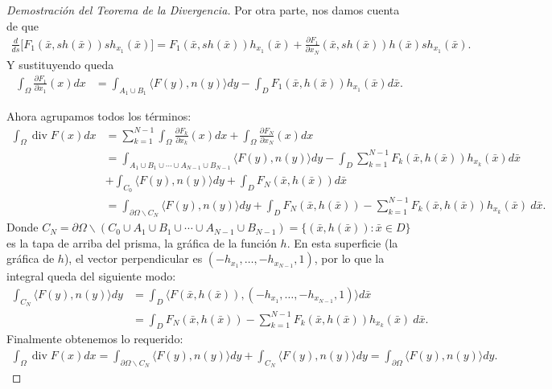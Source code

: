 \documentclass[12pt,spanish]{article}
\theoremstyle{definition}
\theoremstyle{remark}
\begin{document}
\begin{proof}[Demostración del Teorema de la Divergencia]
	Por otra parte, nos damos cuenta de que
	\begin{align*}
	\frac{d}{ds}\big[F_1(\bar{x},sh(\bar{x}))sh_{x_1}(\bar{x})\big]=F_1(\bar{x},sh(\bar{x}))h_{x_1}(\bar{x})+\frac{\partial F_1}{\partial x_N}(\bar{x},sh(\bar{x}))h(\bar{x})sh_{x_1}(\bar{x}).
	\end{align*}
	Y sustituyendo queda
	\begin{align*}
	\int_\Omega\frac{\partial F_1}{\partial x_1}(x)dx
	&=\int_{A_1\cup B_1}\langle F(y),n(y)\rangle dy-\int_D F_1(\bar{x},h(\bar{x}))h_{x_1}(\bar{x})d\bar{x}.
	\end{align*}
	
	Ahora agrupamos todos los términos:
	\begin{align*}
	\int_\Omega \operatorname{div}F(x)dx&=\sum_{k=1}^{N-1}\int_\Omega\frac{\partial F_k}{\partial x_k}(x)dx+\int_\Omega\frac{\partial F_N}{\partial x_N}(x)dx\\
	&=\int_{A_1\cup B_1\cup\cdots\cup A_{N-1}\cup B_{N-1}}\langle F(y),n(y)\rangle dy-\int_D\sum_{k=1}^{N-1}F_k(\bar{x},h(\bar{x}))h_{x_k}(\bar{x})d\bar{x}\\
	&+\int_{C_0}\langle F(y),n(y)\rangle dy + \int_D F_N(\bar{x},h(\bar{x}))d\bar{x} \\
	&=\int_{\partial\Omega\backslash C_N}\langle F(y),n(y)\rangle dy+\int_D F_N(\bar{x},h(\bar{x}))-\sum_{k=1}^{N-1}F_k(\bar{x},h(\bar{x}))h_{x_k}(\bar{x}) \ d\bar{x}.
	\end{align*}
	Donde $C_N=\partial\Omega \backslash\left(C_0\cup A_1\cup B_1\cup\cdots\cup A_{N-1}\cup B_{N-1}\right)=\{(\bar{x},h(\bar{x})):\bar{x}\in D\}$ es la tapa de arriba del prisma, la gráfica de la función $h$. En esta superficie (la gráfica de $h$), el vector perpendicular es $(-h_{x_1},\ldots,-h_{x_{N-1}},1)$, por lo que la integral queda del siguiente modo:
	\begin{align*}
	\int_{C_N} \langle F(y),n(y)\rangle dy &= \int_D \langle F(\bar{x},h(\bar{x})),(-h_{x_1},\ldots,-h_{x_{N-1}},1)\rangle d\bar{x} \\
	&=\int_D F_N(\bar{x},h(\bar{x}))-\sum_{k=1}^{N-1}F_k(\bar{x},h(\bar{x}))h_{x_k}(\bar{x}) \ d\bar{x}.
	\end{align*}
	Finalmente obtenemos lo requerido:
	\begin{align*}
	\int_\Omega \operatorname{div}F(x)dx=\int_{\partial\Omega\backslash C_N}\langle F(y),n(y)\rangle dy+\int_{C_N} \langle F(y),n(y)\rangle dy=\int_{\partial\Omega}\langle F(y),n(y)\rangle dy.
	\end{align*}
	

\end{proof}
\end{document}
